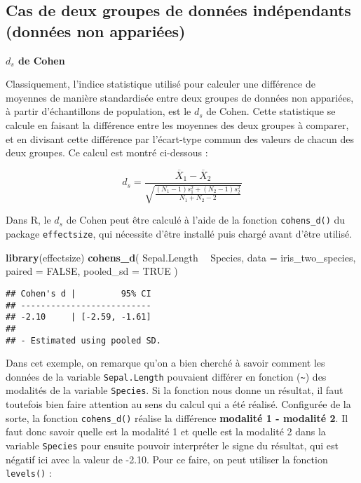 \documentclass[
  french,
]{book}
\newenvironment{Shaded}{\begin{snugshade}}{\end{snugshade}}
\newcommand{\DataTypeTok}[1]{\textcolor[rgb]{0.13,0.29,0.53}{#1}}
\newcommand{\KeywordTok}[1]{\textcolor[rgb]{0.13,0.29,0.53}{\textbf{#1}}}
\newcommand{\NormalTok}[1]{#1}
\newcommand{\OperatorTok}[1]{\textcolor[rgb]{0.81,0.36,0.00}{\textbf{#1}}}
\newcommand{\OtherTok}[1]{\textcolor[rgb]{0.56,0.35,0.01}{#1}}
\newcommand{\StringTok}[1]{\textcolor[rgb]{0.31,0.60,0.02}{#1}}
\begin{document}
\hypertarget{cas-de-deux-groupes-de-donnuxe9es-induxe9pendants-donnuxe9es-non-appariuxe9es}{%
\subsection{Cas de deux groupes de données indépendants (données non appariées)}\label{cas-de-deux-groupes-de-donnuxe9es-induxe9pendants-donnuxe9es-non-appariuxe9es}}

\textbf{\(d_{s}\) de Cohen}

Classiquement, l'indice statistique utilisé pour calculer une différence de moyennes de manière standardisée entre deux groupes de données non appariées, à partir d'échantillons de population, est le \(d_{s}\) de Cohen. Cette statistique se calcule en faisant la différence entre les moyennes des deux groupes à comparer, et en divisant cette différence par l'écart-type commun des valeurs de chacun des deux groupes. Ce calcul est montré ci-dessous :

\[d_{s} = \frac{\overline{X}_{1} - \overline{X}_{2}} {\sqrt{\frac{(N_{1} - 1) s_{1}^2 + (N_{2} - 1) s_{2}^2} {N_{1} + N_{2} - 2}}}\]

Dans R, le \(d_{s}\) de Cohen peut être calculé à l'aide de la fonction \texttt{cohens\_d()} du package \texttt{effectsize}, qui nécessite d'être installé puis chargé avant d'être utilisé.

\begin{Shaded}
\begin{Highlighting}[]
\KeywordTok{library}\NormalTok{(effectsize)}
\KeywordTok{cohens_d}\NormalTok{(}
\NormalTok{  Sepal.Length }\OperatorTok{~}\StringTok{ }\NormalTok{Species, }
  \DataTypeTok{data =}\NormalTok{ iris_two_species, }
  \DataTypeTok{paired =} \OtherTok{FALSE}\NormalTok{, }
  \DataTypeTok{pooled_sd =} \OtherTok{TRUE}
\NormalTok{  )}
\end{Highlighting}
\end{Shaded}

\begin{verbatim}
## Cohen's d |         95% CI
## --------------------------
## -2.10     | [-2.59, -1.61]
## 
## - Estimated using pooled SD.
\end{verbatim}

Dans cet exemple, on remarque qu'on a bien cherché à savoir comment les données de la variable \texttt{Sepal.Length} pouvaient différer en fonction (\texttt{\textasciitilde{}}) des modalités de la variable \texttt{Species}. Si la fonction nous donne un résultat, il faut toutefois bien faire attention au sens du calcul qui a été réalisé. Configurée de la sorte, la fonction \texttt{cohens\_d()} réalise la différence \textbf{modalité 1 - modalité 2}. Il faut donc savoir quelle est la modalité 1 et quelle est la modalité 2 dans la variable \texttt{Species} pour ensuite pouvoir interpréter le signe du résultat, qui est négatif ici avec la valeur de -2.10. Pour ce faire, on peut utiliser la fonction \texttt{levels()} :
\end{document}

